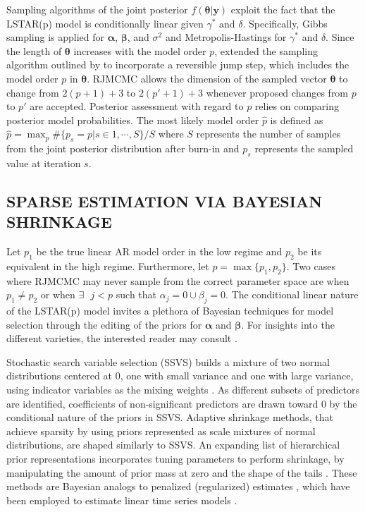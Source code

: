 Sampling algorithms of the joint posterior $f(\bm{\theta}|\bm{y})$ exploit the fact that the LSTAR(p) model is conditionally linear given $\gamma^*$ and $\delta$. Specifically, Gibbs sampling is applied for $\bm{\alpha}$, $\bm{\beta}$, and $\sigma^2$  \citep{Gelfand1990} and Metropolis-Hastings \citep{Metropolis1953,Hastings1970} for $\gamma^*$ and $\delta$. Since the length of $\bm{\theta}$ increases with the model order $p$, \cite{Lopes2006} extended the sampling algorithm outlined by \cite{Lubrano2000} to incorporate a reversible jump step, which includes the model order $p$ in $\bm{\theta}$. RJMCMC allows the dimension of the sampled vector $\bm{\theta}$ to change from $2(p+1)+3$ to $2(p'+1)+3$ whenever proposed changes from $p$ to $p'$ are accepted. Posterior assessment with regard to $p$ relies on comparing  posterior model probabilities. The most likely model order $\hat{p}$ is defined as $\hat{p}=\max_{p}\#\{p_s=p| s \in {1,\cdots, S}\}/S$  where $S$ represents the number of samples from the joint posterior distribution after burn-in and $p_s$ represents the sampled value at iteration $s$. 

\subsection{SPARSE ESTIMATION VIA BAYESIAN SHRINKAGE}
Let $p_1$ be the true linear AR model order in the low regime and $p_2$ be its equivalent in the high regime. Furthermore, let $p=\max\{p_1, p_2\}$. Two cases where RJMCMC may never sample from the correct parameter space are when $p_1\neq p_2$ or when $\exists \textrm{ } j <p$ such that $\alpha_j=0 \cup \beta_j=0$. The conditional linear nature of the LSTAR(p) model invites a plethora of Bayesian techniques for model selection through the editing of the priors for $\bm{\alpha}$ and $\bm{\beta}$. For insights into the different varieties, the interested reader may consult \cite{OHara2009}. 

Stochastic search variable selection (SSVS) builds a mixture of two normal distributions centered at 0, one with small variance and one with large variance, using indicator variables as the mixing weights \citep{George1993}. As different subsets of predictors are identified, coefficients of non-significant predictors are drawn toward 0 by the conditional nature of the priors in SSVS. Adaptive shrinkage methods, that achieve sparsity by using priors represented as scale mixtures of normal distributions, are shaped similarly to SSVS. An expanding list of hierarchical prior representations incorporates tuning parameters to perform shrinkage, by manipulating the amount of prior mass at zero and the shape of the tails \citep{Polson2010}. These methods are Bayesian analogs to penalized (regularized) estimates \citep{Tibshirani1996}, which have been employed to estimate linear time series models \citep{Konzen2016,Nardi2011}. 

